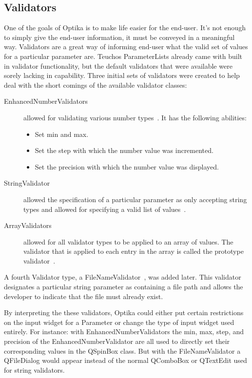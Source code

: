 	\subsection{Validators}
	One of the goals of Optika is to make life easier for the end-user. It's not enough to simply give the end-user information, it must
	be conveyed in a meaningful way. Validators are a great way of informing end-user what the valid set of values for a particular parameter are.
	Teuchos ParameterLists already came with built in validator functionality, but the default validators that were available
	were sorely lacking in capability. Three initial sets of validators were created to help deal with the short comings of
	the available validator classes:
	\begin{description}
		\item[EnhancedNumberValidators] allowed for validating various number types~\cite{EnhancedNumberValidator}. It has the following abilities:
			\begin{itemize}
				\item Set min and max.
				\item Set the step with which the number value was incremented.
				\item Set the precision with which the number value was displayed.
			\end{itemize}
		\item[StringValidator] allowed the specification of a particular parameter as only accepting string types 
		and allowed for specifying a valid list of values~\cite{StringValidator}.
		\item[ArrayValidators] allowed for all validator types to be applied to an array of values. The validator
		that is applied to each entry in the array is called the prototype validator~\cite{ArrayValidator}.
	\end{description}
	A fourth Validator type, a FileNameValidator~\cite{FileNameValidator}, was added later. This validator designates a particular string parameter
	as containing a file path and allows the developer to indicate that the file must already exist.

	By interpreting the these validators, Optika could either put certain restrictions on the input widget for a Parameter or change the
	type of input widget used entirely. For instance: with EnhancedNumberValidators the min, max, step, and precision of the
	EnhancedNumberValidator are all used to directly set their corresponding values in the QSpinBox class. But with the FileNameValidator
	a QFileDialog would appear instead of the normal QComboBox or QTextEdit used for string validators.

